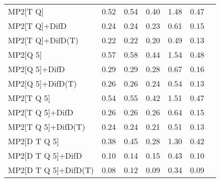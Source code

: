 \begin{table}
\begin{tabular}{l l l l l l l }
    MP2[T Q] & 0.52 & 0.54 & 0.40 & 1.48 & 0.47 \\ 
    MP2[T Q]+DifD & 0.24 & 0.24 & 0.23 & 0.61 & 0.15 \\ 
    MP2[T Q]+DifD(T) & 0.22 & 0.22 & 0.20 & 0.49 & 0.13 \\ 
    MP2[Q 5] & 0.57 & 0.58 & 0.44 & 1.54 & 0.48 \\ 
    MP2[Q 5]+DifD & 0.29 & 0.29 & 0.28 & 0.67 & 0.16 \\ 
    MP2[Q 5]+DifD(T) & 0.26 & 0.26 & 0.24 & 0.54 & 0.13 \\ 
    MP2[T Q 5] & 0.54 & 0.55 & 0.42 & 1.51 & 0.47 \\ 
    MP2[T Q 5]+DifD & 0.26 & 0.26 & 0.26 & 0.64 & 0.15 \\ 
    MP2[T Q 5]+DifD(T) & 0.24 & 0.24 & 0.21 & 0.51 & 0.13 \\ 
    MP2[D T Q 5] & 0.38 & 0.45 & 0.28 & 1.30 & 0.42 \\ 
    MP2[D T Q 5]+DifD & 0.10 & 0.14 & 0.15 & 0.43 & 0.10 \\ 
    MP2[D T Q 5]+DifD(T) & 0.08 & 0.12 & 0.09 & 0.34 & 0.09 \\ 
    \bottomrule
  \end{tabular}
\end{table}
